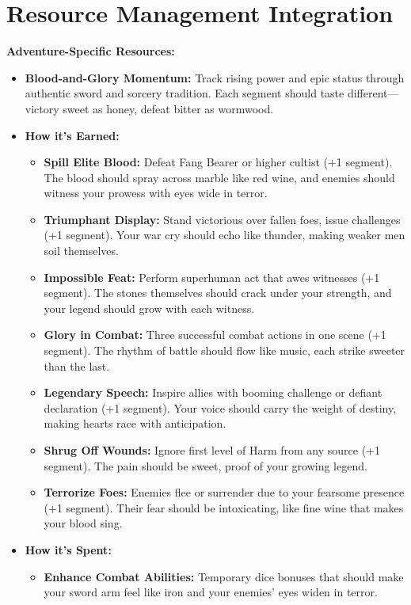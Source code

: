 \documentclass[11pt]{article}
\begin{document}
\section{Resource Management Integration}

\textbf{Adventure-Specific Resources:}
\begin{itemize}
\item \textbf{Blood-and-Glory Momentum:} Track rising power and epic status through authentic sword and sorcery tradition. Each segment should taste different—victory sweet as honey, defeat bitter as wormwood.
\item \textbf{How it's Earned:}
  \begin{itemize}
  \item \textbf{Spill Elite Blood:} Defeat Fang Bearer or higher cultist (+1 segment). The blood should spray across marble like red wine, and enemies should witness your prowess with eyes wide in terror.
  \item \textbf{Triumphant Display:} Stand victorious over fallen foes, issue challenges (+1 segment). Your war cry should echo like thunder, making weaker men soil themselves.
  \item \textbf{Impossible Feat:} Perform superhuman act that awes witnesses (+1 segment). The stones themselves should crack under your strength, and your legend should grow with each witness.
  \item \textbf{Glory in Combat:} Three successful combat actions in one scene (+1 segment). The rhythm of battle should flow like music, each strike sweeter than the last.
  \item \textbf{Legendary Speech:} Inspire allies with booming challenge or defiant declaration (+1 segment). Your voice should carry the weight of destiny, making hearts race with anticipation.
  \item \textbf{Shrug Off Wounds:} Ignore first level of Harm from any source (+1 segment). The pain should be sweet, proof of your growing legend.
  \item \textbf{Terrorize Foes:} Enemies flee or surrender due to your fearsome presence (+1 segment). Their fear should be intoxicating, like fine wine that makes your blood sing.
  \end{itemize}
\item \textbf{How it's Spent:}
  \begin{itemize}
  \item \textbf{Enhance Combat Abilities:} Temporary dice bonuses that should make your sword arm feel like iron and your enemies' eyes widen in terror.

\end{itemize}
\end{itemize}
\end{document}
